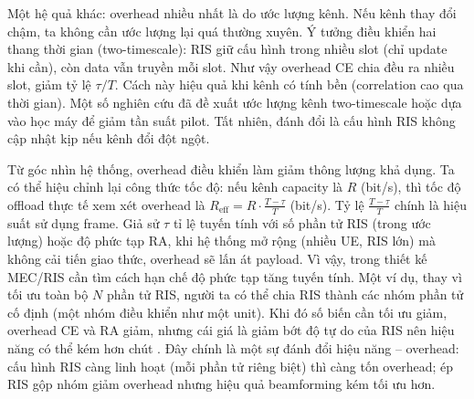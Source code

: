 Một hệ quả khác: overhead nhiều nhất là do ước lượng kênh. Nếu kênh thay đổi chậm, ta không cần ước lượng lại quá thường xuyên. Ý tưởng điều khiển hai thang thời gian (two-timescale): RIS giữ cấu hình trong nhiều slot (chỉ update khi cần), còn data vẫn truyền mỗi slot. Như vậy overhead CE chia đều ra nhiều slot, giảm tỷ lệ $\tau/T$. Cách này hiệu quả khi kênh có tính bền (correlation cao qua thời gian). Một số nghiên cứu đã đề xuất ước lượng kênh two-timescale hoặc dựa vào học máy để giảm tần suất pilot. Tất nhiên, đánh đổi là cấu hình RIS không cập nhật kịp nếu kênh đổi đột ngột.


Từ góc nhìn hệ thống, overhead điều khiển làm giảm thông lượng khả dụng. Ta có thể hiệu chỉnh lại công thức tốc độ: nếu kênh capacity là $R$ (bit/s), thì tốc độ offload thực tế xem xét overhead là $R_\text{eff} = R \cdot \frac{T-\tau}{T}$ (bit/s). Tỷ lệ $\frac{T-\tau}{T}$ chính là hiệu suất sử dụng frame. Giả sử $\tau$ tỉ lệ tuyến tính với số phần tử RIS (trong ước lượng) hoặc độ phức tạp RA, khi hệ thống mở rộng (nhiều UE, RIS lớn) mà không cải tiến giao thức, overhead sẽ lấn át payload. Vì vậy, trong thiết kế MEC/RIS cần tìm cách hạn chế độ phức tạp tăng tuyến tính. Một ví dụ, thay vì tối ưu toàn bộ $N$ phần tử RIS, người ta có thể chia RIS thành các nhóm phần tử cố định (một nhóm điều khiển như một unit). Khi đó số biến cần tối ưu giảm, overhead CE và RA giảm, nhưng cái giá là giảm bớt độ tự do của RIS nên hiệu năng có thể kém hơn chút . Đây chính là một sự đánh đổi hiệu năng – overhead: cấu hình RIS càng linh hoạt (mỗi phần tử riêng biệt) thì càng tốn overhead; ép RIS gộp nhóm giảm overhead nhưng hiệu quả beamforming kém tối ưu hơn.

